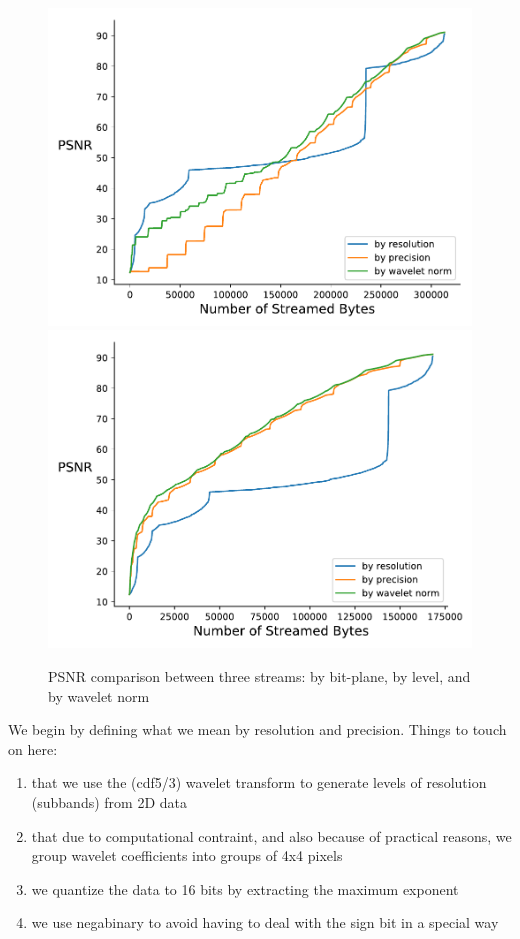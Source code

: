 \begin{figure}[htb!]
	\centering
	{\includegraphics[width=0.4\linewidth]{img/independent/rmse-miranda-viscosity}}
	{\includegraphics[width=0.4\linewidth]{img/skip-zeros/rmse-miranda-viscosity}}
	\caption {PSNR comparison between three streams: by bit-plane, by level, and by wavelet norm}
	\label{fig:psnr_traditional_vs_by_norm_viscosity}
\end{figure}


We begin by defining what we mean by resolution and precision. Things to touch on here:

\begin{enumerate}
  \item that we use the (cdf5/3) wavelet transform to generate levels of resolution (subbands) from 2D data
  \item that due to computational contraint, and also because of practical reasons, we group wavelet coefficients into groups of 4x4 pixels
  \item we quantize the data to 16 bits by extracting the maximum exponent
  \item we use negabinary to avoid having to deal with the sign bit in a special way
\end{enumerate}

